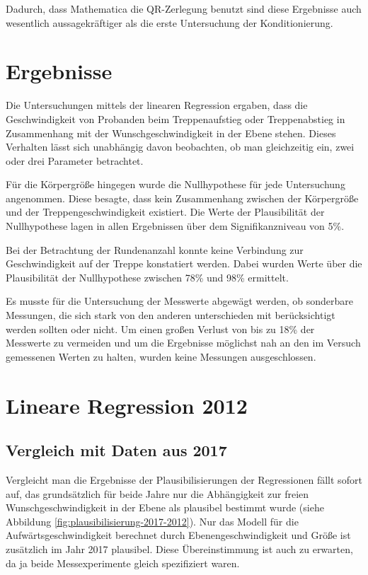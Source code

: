 Dadurch, dass Mathematica die QR-Zerlegung benutzt sind diese Ergebnisse auch wesentlich aussagekräftiger als die erste Untersuchung der Konditionierung.

\section{Ergebnisse}

Die Untersuchungen mittels der linearen Regression ergaben, dass die Geschwindigkeit von Probanden beim Treppenaufstieg oder Treppenabstieg in Zusammenhang mit der Wunschgeschwindigkeit in der Ebene stehen. Dieses Verhalten lässt sich unabhängig davon beobachten, ob man gleichzeitig ein, zwei oder drei Parameter betrachtet.

Für die Körpergröße hingegen wurde die Nullhypothese für jede Untersuchung angenommen. Diese besagte, dass kein Zusammenhang zwischen der Körpergröße und der Treppengeschwindigkeit existiert. Die Werte der Plausibilität der Nullhypothese lagen in allen Ergebnissen über dem Signifikanzniveau von 5\%.

Bei der Betrachtung der Rundenanzahl konnte keine Verbindung zur Geschwindigkeit auf der Treppe konstatiert werden. Dabei wurden Werte über die Plausibilität der Nullhypothese zwischen 78\% und 98\% ermittelt.

Es musste für die Untersuchung der Messwerte abgewägt werden, ob sonderbare Messungen, die sich stark von den anderen unterschieden mit berücksichtigt werden sollten oder nicht. Um einen großen Verlust von bis zu 18\% der Messwerte zu vermeiden und um die Ergebnisse möglichst nah an den im Versuch gemessenen Werten zu halten, wurden keine Messungen ausgeschlossen.

\section{Lineare Regression 2012}


\subsection{Vergleich mit Daten aus 2017}

Vergleicht man die Ergebnisse der Plausibilisierungen der Regressionen fällt sofort auf, das grundsätzlich für beide Jahre nur die Abhängigkeit zur freien Wunschgeschwindigkeit in der Ebene als plausibel bestimmt wurde (siehe Abbildung \ref{fig:plausibilisierung-2017-2012}). Nur das Modell für die Aufwärtsgeschwindigkeit berechnet durch Ebenengeschwindigkeit und Größe ist zusätzlich im Jahr 2017 plausibel. Diese Übereinstimmung ist auch zu erwarten, da ja beide Messexperimente gleich spezifiziert waren.

